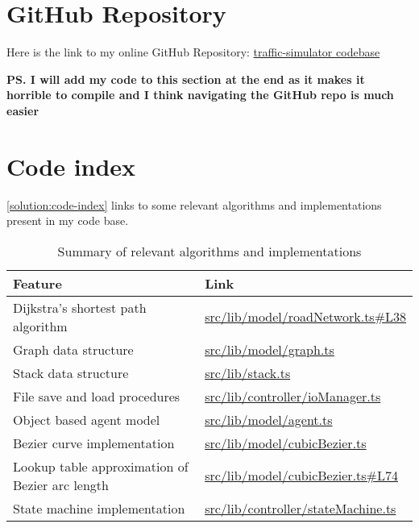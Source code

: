 \section{GitHub Repository}

    Here is the link to my online GitHub Repository: \href{https://github.com/joshua-smart/traffic-simulator}{traffic-simulator codebase}

    \textbf{PS. I will add my code to this section at the end as it makes it horrible to compile and I think navigating the GitHub repo is much easier}

    \section{Code index}

    \autoref{solution:code-index} links to some relevant algorithms and implementations present in my code base.

    \begin{table}[ht]
        \centering
        \begin{tabular}{|p{}|p{}|}
            \hline
            \textbf{Feature} & \textbf{Link}
            \\\hline
            Dijkstra's shortest path algorithm & \href{https://github.com/joshua-smart/traffic-simulator/blob/main/src/lib/model/roadNetwork.ts#L38}{src/lib/model/roadNetwork.ts\#L38}
            \\\hline
            Graph data structure & \href{https://github.com/joshua-smart/traffic-simulator/blob/main/src/lib/model/graph.ts}{src/lib/model/graph.ts}
            \\\hline
            Stack data structure & \href{https://github.com/joshua-smart/traffic-simulator/blob/main/src/lib/stack.ts}{src/lib/stack.ts}
            \\\hline
            File save and load procedures & \href{https://github.com/joshua-smart/traffic-simulator/blob/main/src/lib/controller/ioManager.ts}{src/lib/controller/ioManager.ts}
            \\\hline
            Object based agent model & \href{https://github.com/joshua-smart/traffic-simulator/blob/main/src/lib/model/agent.ts}{src/lib/model/agent.ts}
            \\\hline
            Bezier curve implementation & \href{https://github.com/joshua-smart/traffic-simulator/blob/main/src/lib/model/cubicBezier.ts}{src/lib/model/cubicBezier.ts}
            \\\hline
            Lookup table approximation of Bezier arc length & \href{https://github.com/joshua-smart/traffic-simulator/blob/main/src/lib/model/cubicBezier.ts#L74}{src/lib/model/cubicBezier.ts\#L74}
            \\\hline
            State machine implementation & \href{https://github.com/joshua-smart/traffic-simulator/blob/main/src/lib/controller/stateMachine.ts}{src/lib/controller/stateMachine.ts}
            \\\hline
        \end{tabular}
        \caption{Summary of relevant algorithms and implementations}
        \label{solution:code-index}
    \end{table}
